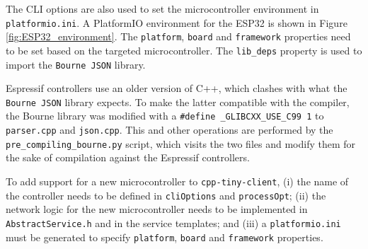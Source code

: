\documentclass[manuscript,screen]{acmart}
\begin{document}



The CLI options are also used to set the microcontroller environment in \texttt{platformio.ini}. A PlatformIO environment for the ESP32 is shown in Figure \ref{fig:ESP32_environment}. 
%
The \texttt{platform}, \texttt{board} and \texttt{framework} properties need to be set based on the targeted microcontroller. The \texttt{lib\_deps} property is used to import the \texttt{Bourne JSON} library. 

Espressif controllers use an older version of C++, which clashes with what the \texttt{Bourne JSON} library expects. To make the latter compatible with the compiler, the Bourne library was modified with a \texttt{\#define \_GLIBCXX\_USE\_C99 1} to \texttt{parser.cpp} and \texttt{json.cpp}. This and other operations are performed by the \texttt{pre\_compiling\_bourne.py} script, which visits the two files and modify them for the sake of compilation against the Espressif controllers. 

To add support for a new microcontroller to \texttt{cpp-tiny-client}, (i) the name of the controller needs to be defined in \texttt{cliOptions} and \texttt{processOpt}; (ii) the network logic for the new microcontroller needs to be implemented in \texttt{AbstractService.h} and in the service templates; and (iii) a \texttt{platformio.ini} must be generated to specify \texttt{platform}, \texttt{board} and \texttt{framework} properties. 


\end{document}

